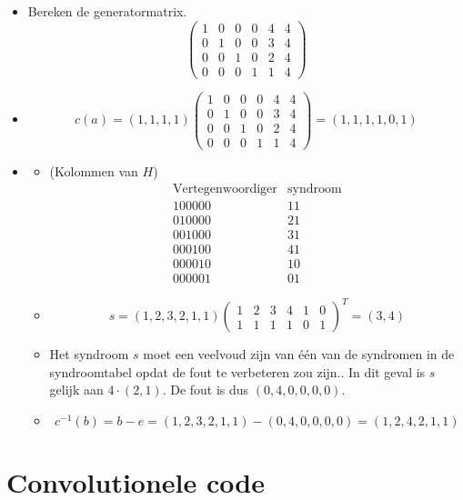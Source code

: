 \documentclass[main.tex]{subfiles}
\begin{document}
\begin{itemize}
\item Bereken de generatormatrix.
\[
\begin{pmatrix}
  1 & 0 & 0 & 0 & 4 & 4\\
  0 & 1 & 0 & 0 & 3 & 4\\
  0 & 0 & 1 & 0 & 2 & 4\\
  0 & 0 & 0 & 1 & 1 & 4
\end{pmatrix}
\]
\item
  \[ 
  c(a) = (1,1,1,1)
  \begin{pmatrix}
    1 & 0 & 0 & 0 & 4 & 4\\
    0 & 1 & 0 & 0 & 3 & 4\\
    0 & 0 & 1 & 0 & 2 & 4\\
    0 & 0 & 0 & 1 & 1 & 4
  \end{pmatrix}
  = (1,1,1,1,0,1)
  \]
\item
  \begin{itemize}
  \item (Kolommen van $H$)
    \[
    \begin{array}{c|c}
      \text{Vertegenwoordiger} & \text{syndroom}\\\hline
      100000 & 11\\
      010000 & 21\\
      001000 & 31\\
      000100 & 41\\
      000010 & 10\\
      000001 & 01
    \end{array}
    \]
  \item 
    \[
    s = (1,2,3,2,1,1)
    \begin{pmatrix}
      1 & 2 & 3 & 4 & 1 & 0\\
      1 & 1 & 1 & 1 & 0 & 1
    \end{pmatrix}^{T}
    = (3,4)
    \]
  \item Het syndroom $s$ moet een veelvoud zijn van \'e\'en van de syndromen in de syndroomtabel opdat de fout te verbeteren zou zijn..
    In dit geval is $s$ gelijk aan $4\cdot (2,1)$.
    De fout is dus $(0,4,0,0,0,0)$.
  \item 
    \[
    c^{-1}(b) = b-e= (1,2,3,2,1,1) - (0,4,0,0,0,0)= (1,2,4,2,1,1)
    \]
  \end{itemize}
\end{itemize}

\newpage

\section{Convolutionele code}
\end{document}
